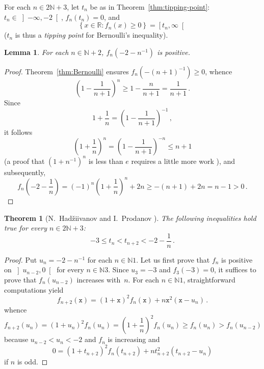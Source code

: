 \documentclass[12pt]{article}
\newcommand{\bR}{\mathbb{R}}
\newcommand{\bN}{\mathbb{N}}
\newcommand{\geint}[1]{\left[ #1, \infty \right[}
\newcommand{\ltint}[1]{\left]- \infty, #1 \right[}
\newcommand{\ttx}{\mathtt{x}}
\newtheorem{theorem}{Theorem}
\newtheorem{lemma}{Lemma}
\begin{document}
 For each $n \in 2 \bN + 3$,
 let $t_n$ be as in Theorem~\ref{thm:tipping-point}:
 $t_n \in \ltint{- 2}$,
 $f_n(t_n) = 0$,
 and 
 $$
 \left\{ x \in \bR : f_n(x) \ge 0 \right\}
 = \geint{t_n} 
 $$
 ($t_n$ is thus a \emph{tipping point} for Bernoulli's inequality).
  
 

 \begin{lemma}
   For each $n \in \bN + 2$, $f_n(- 2 - n^{-1})$ is positive.
 \end{lemma}
 
 \begin{proof}
   Theorem~\ref{thm:Bernoulli} ensures $f_n(- {(n + 1)}^{-1}) \ge 0$, whence
   $$
   \left( 1 - \frac{1}{n + 1} \right)^n \ge 1 - \frac{n}{n + 1} = \frac{1}{n + 1} \, .
   $$
   Since 
   $$
   1 + \frac{1}{n} = \left( 1 - \frac{1}{n + 1} \right)^{-1} \,,
   $$
   it follows 
   $$
  \left( 1 + \frac{1}{n} \right)^n = \left( 1 - \frac{1}{n + 1} \right)^{-n}  \le n + 1 
  $$
  (a proof that ${(1 + n^{-1} )}^n$ is less than $e$ requires a little more work \cite{Wiener85}),
  and subsequently,
  $$
  f_n \left(- 2 - \frac{1}{n} \right) = {(- 1)}^n \left( 1 + \frac{1}{n} \right)^n + 2 n \ge - (n + 1) + 2 n = n - 1 > 0 \,.
  $$
 \end{proof} 
 
 \begin{theorem} [N.~Had\v{z}iivanov and I.~Prodanov \cite{MitrinovicAI,MitrinovicCNIA}] \label{thm:bulgare}
   The following inequalities hold true for every $n \in 2 \bN + 3$:
   $$
   - 3 \le t_n < t_{n + 2} < - 2 - \frac{1}{n} \,.
   $$
 \end{theorem}
 
 \begin{proof}
   Put $u_n = - 2 - n^{-1}$ for each $n \in \bN{1}$.
   Let us first prove that $f_n$ is positive on $\left]u_{n - 2}, 0 \right[$ for every $n \in \bN{3}$.
   Since $u_3 = - 3$ and $f_3(- 3) = 0$, it suffices to prove that $f_n(u_{n - 2})$ increases with~$n$.
   For each $n \in \bN{1}$, straightforward computations yield 
   $$
   f_{n + 2} (\ttx) = {(1 + \ttx)}^2 f_n(\ttx) + n \ttx^2 (\ttx - u_n) \,.
   $$
   whence
   $$
   f_{n + 2}(u_n)
   =
   {(1 + u_n )}^2 f_n(u_n)
   =
   {\left(1 + \frac{1}{n} \right)}^2 f_n(u_n)
   \ge
   f_n(u_n)
   >
   f_n(u_{n - 2})
   $$
   because $u_{n - 2} < u_n < - 2$ and $f_n$ is increasing 
   and
   $$
   0 = {(1 + t_{n + 2})}^2 f_n(t_{n + 2}) +  n t_{n + 2}^2 (t_{n + 2} - u_n)  
   $$
   if $n$ is odd.
 \end{proof}   

 
  
\end{document}
